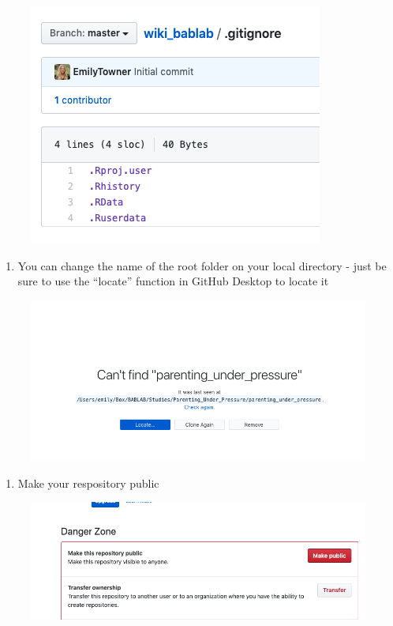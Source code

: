 \documentclass[]{book}
\providecommand{\tightlist}{%
  \setlength{\itemsep}{0pt}\setlength{\parskip}{0pt}}
\begin{document}
\begin{figure}
\centering
\includegraphics{images/research_protocols/github/18.png}
\caption{}
\end{figure}

\begin{enumerate}
\def\labelenumi{\arabic{enumi}.}
\setcounter{enumi}{11}
\tightlist
\item
  You can change the name of the root folder on your local directory -
  just be sure to use the ``locate'' function in GitHub Desktop to
  locate it
\end{enumerate}

\begin{figure}
\centering
\includegraphics{images/research_protocols/github/20.png}
\caption{}
\end{figure}

\begin{enumerate}
\def\labelenumi{\arabic{enumi}.}
\setcounter{enumi}{12}
\tightlist
\item
  Make your respository public
\end{enumerate}

\begin{figure}
\centering
\includegraphics{images/research_protocols/github/19.png}
\caption{}
\end{figure}
\end{document}
